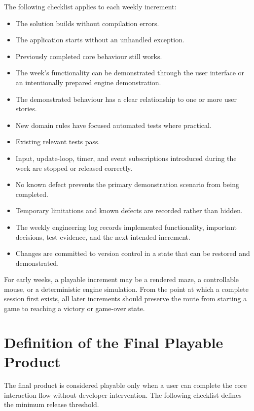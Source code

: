 The following checklist applies to each weekly increment:

\begin{itemize}
	\item[$\square$] The solution builds without compilation errors.
	\item[$\square$] The application starts without an unhandled exception.
	\item[$\square$] Previously completed core behaviour still works.
	\item[$\square$] The week's functionality can be demonstrated through the user interface or an intentionally prepared engine demonstration.
	\item[$\square$] The demonstrated behaviour has a clear relationship to one or more user stories.
	\item[$\square$] New domain rules have focused automated tests where practical.
	\item[$\square$] Existing relevant tests pass.
	\item[$\square$] Input, update-loop, timer, and event subscriptions introduced during the week are stopped or released correctly.
	\item[$\square$] No known defect prevents the primary demonstration scenario from being completed.
	\item[$\square$] Temporary limitations and known defects are recorded rather than hidden.
	\item[$\square$] The weekly engineering log records implemented functionality, important decisions, test evidence, and the next intended increment.
	\item[$\square$] Changes are committed to version control in a state that can be restored and demonstrated.
\end{itemize}

For early weeks, a playable increment may be a rendered maze, a controllable mouse, or a deterministic engine simulation. From the point at which a complete session first exists, all later increments should preserve the route from starting a game to reaching a victory or game-over state.

\section{Definition of the Final Playable Product}
\label{sec:final-playable-product}

The final product is considered playable only when a user can complete the core interaction flow without developer intervention. The following checklist defines the minimum release threshold.

